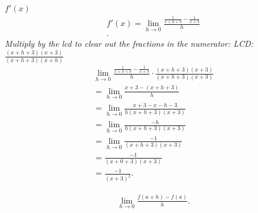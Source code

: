 \documentclass{report}
\begin{document}
        \bigbreak \noindent 
        \textbf{$f\prime(x)$}
        \begin{align*}
            f\prime(x) = \lim\limits_{h \to 0}{ \frac{ \frac{1}{x+h+3} - \frac{1}{x+3}}{h}} \\ 
        .\end{align*}
        \bigbreak \noindent 
        \textit{Multiply by the lcd to clear out the fractions in the numerator: LCD: $ \frac{(x+h+3)(x+3)}{(x+h+3)(x+h)}$}
        \begin{align*}
            \lim\limits_{h \to 0}{\frac{ \frac{1}{x+h+3} - \frac{1}{x+3}}{h}} \cdot \frac{(x+h+3)(x+3)}{(x+h+3)(x+3)} \\
            = \lim\limits_{h \to 0}{ \frac{x+3 - (x+h+3)}{h}} \\ 
            = \lim\limits_{h \to 0}{ \frac{x+3-x-h-3}{h(x+h+3)(x+3)}} \\ 
            = \lim\limits_{h \to 0}{ \frac{-h}{h(x+h+3)(x+3)}} \\ 
            = \lim\limits_{h \to 0}{ \frac{-1}{(x+h+3)(x+3)}} \\
            = \frac{-1}{(x+0+3)(x+3)} \\ 
            = \frac{-1}{(x+3)^2}
        .\end{align*}


        \begin{align*}
          \lim\limits_{h \to 0}{ \frac{ f(a+h) - f(a)}{h}}
        .\end{align*}
\end{document}
